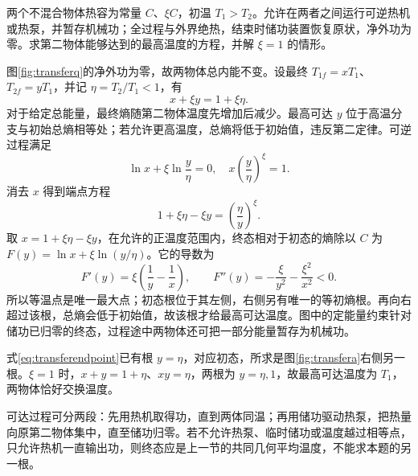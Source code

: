 \begin{example}[用可逆装置转移温度的可达端点]\label{ex:temperaturetransfer}
两个不混合物体热容为常量 $C$、$\xi C$，初温 $T_1>T_2$。允许在两者之间运行可逆热机或热泵，并暂存机械功；全过程与外界绝热，结束时储功装置恢复原状，净外功为零。求第二物体能够达到的最高温度的方程，并解 $\xi=1$ 的情形。
\end{example}
\begin{solution}
图\ref{fig:transferq}的净外功为零，故两物体总内能不变。设最终 $T_{1f}=xT_1$、$T_{2f}=yT_1$，并记 $\eta=T_2/T_1<1$，有
\[
 x+\xi y=1+\xi\eta.
\]
对于给定总能量，最终熵随第二物体温度先增加后减少。最高可达 $y$ 位于高温分支与初始总熵相等处；若允许更高温度，总熵将低于初始值，违反第二定律。可逆过程满足
\[
 \ln x+\xi\ln\frac y\eta=0,
 \quad x\left(\frac y\eta\right)^\xi=1.
\]
消去 $x$ 得到端点方程
\begin{equation}\label{eq:transferendpoint}
 1+\xi\eta-\xi y=\left(\frac\eta y\right)^\xi.
\end{equation}
取 $x=1+\xi\eta-\xi y$，在允许的正温度范围内，终态相对于初态的熵除以 $C$ 为 $F(y)=\ln x+\xi\ln(y/\eta)$。它的导数为
\[
 F'(y)=\xi\left(\frac1y-\frac1x\right),\qquad
 F''(y)=-\frac\xi{y^2}-\frac{\xi^2}{x^2}<0.
\]
所以等温点是唯一最大点；初态根位于其左侧，右侧另有唯一的等初熵根。再向右超过该根，总熵会低于初始值，故该根才给最高可达温度。图中的定能量约束针对储功已归零的终态，过程途中两物体还可把一部分能量暂存为机械功。

式\eqref{eq:transferendpoint}已有根 $y=\eta$，对应初态，所求是图\ref{fig:transfera}右侧另一根。$\xi=1$ 时，$x+y=1+\eta$、$xy=\eta$，两根为 $y=\eta,1$，故最高可达温度为 $T_1$，两物体恰好交换温度。

可达过程可分两段：先用热机取得功，直到两体同温；再用储功驱动热泵，把热量向原第二物体集中，直至储功归零。若不允许热泵、临时储功或温度越过相等点，只允许热机一直输出功，则终态应是上一节的共同几何平均温度，不能求本题的另一根。
\end{solution}

